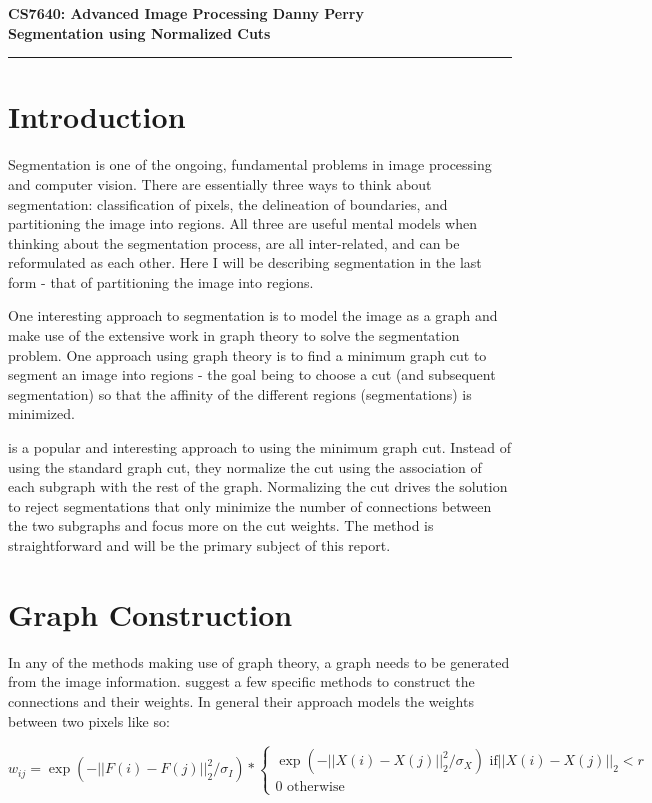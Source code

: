\documentclass[11pt]{article}
\begin{document}
\thispagestyle{empty}
{\large{\bf CS7640: Advanced Image Processing \hfill Danny Perry}}\\

{\LARGE{\bf Segmentation using Normalized Cuts}}
\vspace{0.2\baselineskip}
\hrule

\section{Introduction}
Segmentation is one of the ongoing, fundamental problems in image processing and computer vision. 
There are essentially three ways to think about segmentation: classification of pixels, the delineation of boundaries, and partitioning the image into regions.
All three are useful mental models when thinking about the segmentation process, are all inter-related, and can be reformulated as each other.
Here I will be describing segmentation in the last form - that of partitioning the image into regions.

One interesting approach to segmentation is to model the image as a graph and make use of the extensive work in graph theory to solve the segmentation problem.
One approach using graph theory is to find a minimum graph cut to segment an image into regions - the goal being to choose a cut (and subsequent segmentation) so that the affinity of the different regions (segmentations) is minimized.

\cite{Shi2000} is a popular and interesting approach to using the minimum graph cut. 
Instead of using the standard graph cut, they normalize the cut using the association of each subgraph with the rest of the graph.
Normalizing the cut drives the solution to reject segmentations that only minimize the number of connections between the two subgraphs and focus more on the cut weights.
The method is straightforward and will be the primary subject of this report.

\section{Graph Construction}

In any of the methods making use of graph theory, a graph needs to be generated from the image information.
\cite{Shi2000} suggest a few specific methods to construct the connections and their weights.
In general their approach models the weights between two pixels like so:

\begin{equation*}
  w_{ij} = \exp(-||F(i)-F(j)||^2_2 / \sigma_I ) * 
  \begin{cases}
    \exp(-||X(i)-X(j)||^2_2 / \sigma_X ) \text{    if} ||X(i)-X(j)||_2 < r \\
    0 \text{  otherwise}
  \end{cases}
\end{equation*}
\end{document}
